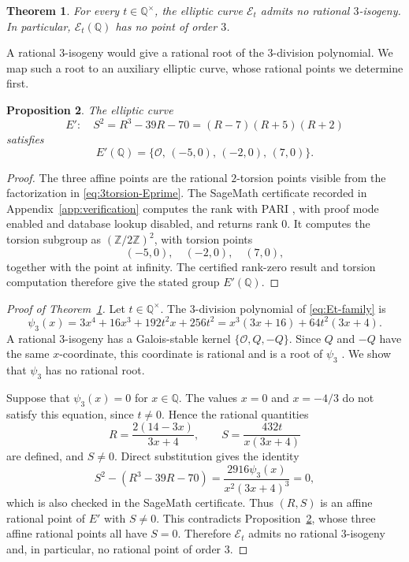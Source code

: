 \documentclass[11pt,a4paper]{amsart}
\newtheorem{theorem}{Theorem}[section]
\newtheorem{proposition}[theorem]{Proposition}
\theoremstyle{definition}
\theoremstyle{remark}
\numberwithin{equation}{section}
\newcommand{\Q}{\mathbb{Q}}
\newcommand{\Z}{\mathbb{Z}}
\newcommand{\mathcalE}{\mathcal{E}}
\begin{document}
\begin{theorem}\label{thm:no-3-torsion}
For every $t\in\Q^\times$, the elliptic curve $\mathcalE_t$ admits no rational $3$-isogeny. In particular, $\mathcalE_t(\Q)$ has no point of order $3$.
\end{theorem}

A rational $3$-isogeny would give a rational root of the $3$-division
polynomial. We map such a root to an auxiliary elliptic curve, whose
rational points we determine first.

\begin{proposition}\label{prop:3torsion-auxiliary}
The elliptic curve
\begin{equation}\label{eq:3torsion-Eprime}
E':\quad S^2=R^3-39R-70=(R-7)(R+5)(R+2)
\end{equation}
satisfies
\[
E'(\Q)=\{\mathcal O,\,(-5,0),\,(-2,0),\,(7,0)\}.
\]
\end{proposition}

\begin{proof}
The three affine points are the rational $2$-torsion points visible from the
factorization in \eqref{eq:3torsion-Eprime}. The SageMath certificate
recorded in Appendix~\ref{app:verification} computes the rank with PARI \cite{pari},
with proof mode enabled and database lookup disabled, and returns rank \(0\).
It computes the torsion subgroup as \((\Z/2\Z)^2\), with torsion points
\[
(-5,0),\quad (-2,0),\quad (7,0),
\]
together with the point at infinity. The certified rank-zero result and
torsion computation therefore give the stated group $E'(\Q)$.
\end{proof}

\begin{proof}[Proof of Theorem~\ref{thm:no-3-torsion}]
Let $t\in\Q^\times$. The $3$-division polynomial of
\eqref{eq:Et-family} is
\begin{equation}\label{eq:3torsion-psi3}
\psi_3(x)=3x^4+16x^3+192t^2x+256t^2
=x^3(3x+16)+64t^2(3x+4).
\end{equation}
A rational $3$-isogeny has a Galois-stable kernel
$\{\mathcal O,Q,-Q\}$. Since $Q$ and $-Q$ have the same
$x$-coordinate, this coordinate is rational and is a root of $\psi_3$
\cite[Chapter~III, Exercise~3.7]{silverman2009arithmetic}.
We show that $\psi_3$ has no rational root.

Suppose that $\psi_3(x)=0$ for $x\in\Q$. The values $x=0$ and
$x=-4/3$ do not satisfy this equation, since $t\neq0$. Hence the
rational quantities
\begin{equation}\label{eq:3torsion-RS}
R=\frac{2(14-3x)}{3x+4},\qquad
S=\frac{432t}{x(3x+4)}
\end{equation}
are defined, and $S\neq0$. Direct substitution gives the identity
\[
S^2-(R^3-39R-70)
=\frac{2916\psi_3(x)}{x^2(3x+4)^3}=0,
\]
which is also checked in the SageMath certificate. Thus $(R,S)$ is an
affine rational point of $E'$ with $S\neq0$. This contradicts
Proposition~\ref{prop:3torsion-auxiliary}, whose three affine rational
points all have $S=0$. Therefore $\mathcalE_t$ admits no rational
$3$-isogeny and, in particular, no rational point of order $3$.
\end{proof}
\end{document}
